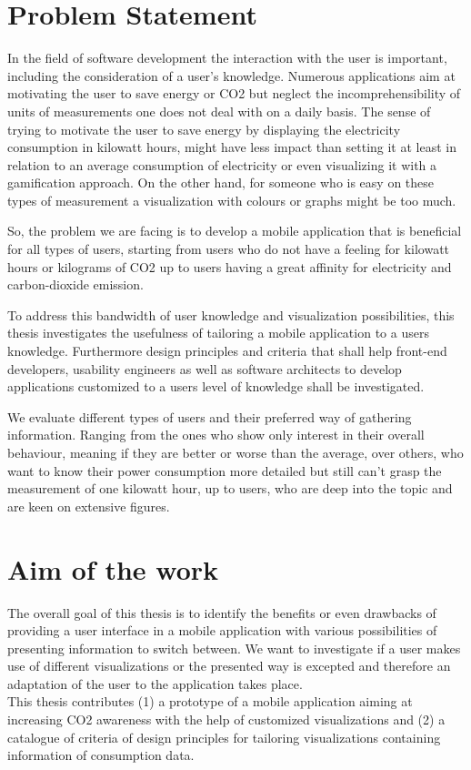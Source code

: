 \section{Problem Statement}

In the field of software development the interaction with the user is important, including the consideration of a user's knowledge. Numerous applications aim at motivating the user to save energy or CO2 but neglect the incomprehensibility of units of measurements one does not deal with on a daily basis. The sense of trying to motivate the user to save energy by displaying the electricity consumption in kilowatt hours, might have less impact than setting it at least in relation to an average consumption of electricity or even visualizing it with a gamification approach. On the other hand, for someone who is easy on these types of measurement a visualization with colours or graphs might be too much.

So, the problem we are facing is to develop a mobile application that is beneficial for all types of users, starting from users who do not have a feeling for kilowatt hours or kilograms of CO2 up to users having a great affinity for electricity and carbon-dioxide emission.

To address this bandwidth of user knowledge and visualization possibilities, this thesis investigates the usefulness of tailoring a mobile application to a users knowledge. Furthermore design principles and criteria that shall help front-end developers, usability engineers as well as software architects to develop applications customized to a users level of knowledge shall be investigated.

We evaluate different types of users and their preferred way of gathering information. Ranging from the ones who show only interest in their overall behaviour, meaning if they are better or worse than the average, over others, who want to know their power consumption more detailed but still can't grasp the measurement of one kilowatt hour, up to users, who are deep into the topic and are keen on extensive figures.

\section{Aim of the work} 
The overall goal of this thesis is to identify the benefits or even drawbacks of providing a user interface in a mobile application with various possibilities of presenting information to switch between. We want to investigate if a user makes use of different visualizations or the presented way is excepted and therefore an adaptation of the user to the application takes place.\\
This thesis contributes 
(1) a prototype of a mobile application aiming at increasing CO2 awareness with the help of customized visualizations and
(2) a catalogue of criteria of design principles for tailoring visualizations containing information of consumption data.

